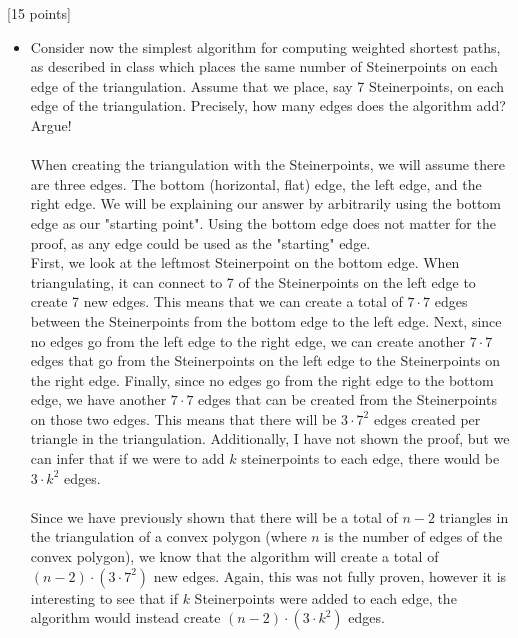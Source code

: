\documentclass[12pt]{article}
\newcounter{ques}
\newenvironment{question}{\stepcounter{ques}{\noindent\bf Question \arabic{ques}:}}{\vspace{5mm}}
\begin{document}
\begin{question}[15 points]
\begin{itemize}
	\item Consider now the simplest algorithm for computing weighted shortest paths, as described in class which places the same number of Steinerpoints on each edge of the triangulation.   Assume that we place, say 7 Steinerpoints,  on each edge of the triangulation. Precisely, how many edges does the algorithm add? Argue!\\\\
  When creating the triangulation with the Steinerpoints, we will assume there are three edges. The bottom (horizontal, flat) edge, the left edge, and the right edge. We will be explaining our answer by arbitrarily using the bottom edge as our "starting point". Using the bottom edge does not matter for the proof, as any edge could be used as the "starting" edge.\\
  First, we look at the leftmost Steinerpoint on the bottom edge. When triangulating, it can connect to 7 of the Steinerpoints on the left edge to create 7 new edges. This means that we can create a total of $7\cdot 7$ edges between the Steinerpoints from the bottom edge to the left edge. Next, since no edges go from the left edge to the right edge, we can create another $7\cdot 7$ edges that go from the Steinerpoints on the left edge to the Steinerpoints on the right edge. Finally, since no edges go from the right edge to the bottom edge, we have another $7\cdot 7$ edges that can be created from the Steinerpoints on those two edges. This means that there will be $3\cdot 7^2$ edges created per triangle in the triangulation. Additionally, I have not shown the proof, but we can infer that if we were to add $k$ steinerpoints to each edge, there would be $3\cdot k^2$ edges.\\\\
  Since we have previously shown that there will be a total of $n-2$ triangles in the triangulation of a convex polygon (where $n$ is the number of edges of the convex polygon), we know that the algorithm will create a total of $(n-2)\cdot(3\cdot 7^2)$ new edges. Again, this was not fully proven, however it is interesting to see that if $k$ Steinerpoints were added to each edge, the algorithm would instead create $(n-2)\cdot(3\cdot k^2)$ edges.

\end{itemize}


\end{question}

\newpage
\end{document}
